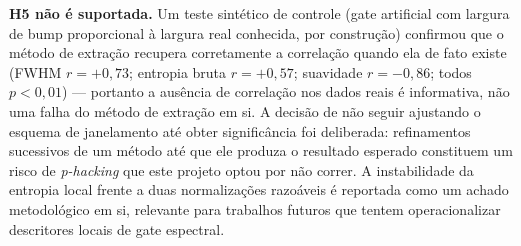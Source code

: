 \textbf{H5 não é suportada.} Um teste sintético de controle (gate artificial com largura de bump proporcional à largura real conhecida, por construção) confirmou que o método de extração recupera corretamente a correlação quando ela de fato existe (FWHM $r=+0{,}73$; entropia bruta $r=+0{,}57$; suavidade $r=-0{,}86$; todos $p<0{,}01$) --- portanto a ausência de correlação nos dados reais é informativa, não uma falha do método de extração em si. A decisão de não seguir ajustando o esquema de janelamento até obter significância foi deliberada: refinamentos sucessivos de um método até que ele produza o resultado esperado constituem um risco de \emph{p-hacking} que este projeto optou por não correr. A instabilidade da entropia local frente a duas normalizações razoáveis é reportada como um achado metodológico em si, relevante para trabalhos futuros que tentem operacionalizar descritores locais de gate espectral.

